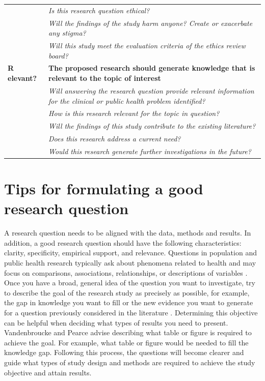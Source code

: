 \documentclass[
]{book}
\begin{document}
\begin{longtable}[]{@{}
  >{\raggedright\arraybackslash}p{}
  >{\raggedright\arraybackslash}p{}@{}}
& \emph{Is this research question ethical?} \\
& \emph{Will the findings of the study harm anyone? Create or exacerbate any stigma?} \\
& \emph{Will this study meet the evaluation criteria of the ethics review board?} \\
\textbf{R elevant?} & \textbf{The proposed research should generate knowledge that is relevant to the topic of interest} \\
& \emph{Will answering the research question provide relevant information for the clinical or public health problem identified?} \\
& \emph{How is this research relevant for the topic in question?} \\
& \emph{Will the findings of this study contribute to the existing literature?} \\
& \emph{Does this research address a current need?} \\
& \emph{Would this research generate further investigations in the future?} \\
\bottomrule
\end{longtable}

\hypertarget{tips-for-formulating-a-good-research-question}{%
\section{Tips for formulating a good research question}\label{tips-for-formulating-a-good-research-question}}

A research question needs to be aligned with the data, methods and results. In addition, a good research question should have the following characteristics: clarity, specificity, empirical support, and relevance. Questions in population and public health research typically ask about phenomena related to health and may focus on comparisons, associations, relationships, or descriptions of variables \citep{creswell2017research}. Once you have a broad, general idea of the question you want to investigate, try to describe the goal of the research study as precisely as possible, for example, the gap in knowledge you want to fill or the new evidence you want to generate for a question previously considered in the literature \citep{vandenbroucke2018ideas}. Determining this objective can be helpful when deciding what types of results you need to present. Vandenbroucke and Pearce \citep{vandenbroucke2018ideas} advise describing what table or figure is required to achieve the goal. For example, what table or figure would be needed to fill the knowledge gap. Following this process, the questions will become clearer and guide what types of study design and methods are required to achieve the study objective and attain results.
\end{document}
